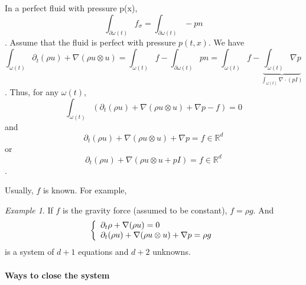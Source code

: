 \documentclass{report}
\newcommand{\R}{\ensuremath{\mathbb{R}}} %
\theoremstyle{plain}
\theoremstyle{definition}
\theoremstyle{remark}
\newtheorem*{ex}{Example}
\begin{document}
In a perfect fluid with pressure p(x),
\begin{equation}
	\int_{\partial\omega(t)}f_\sigma =
	\int_{\partial\omega(t)}-pn
\end{equation}.
Assume that the fluid is perfect with pressure $p(t,x)$.
We have 
$$\int_{\omega(t)}\partial_t(\rho u)+\nabla(\rho u\otimes u)
= \int_{\omega(t)} f - \int_{\partial\omega(t)} p n
= \int_{\omega(t)} f - \underbrace{\int_{\omega(t)} \nabla p
}_{\int_{\omega(t)} \nabla\cdot (p I)}
$$.
Thus, for any $\omega(t)$,
\begin{equation}
	\int_{\omega(t)}\left( 
	\partial_t(\rho u)+\nabla(\rho u\otimes u)
	+  \nabla p - f \right) = 0
\end{equation}
and 
\begin{equation}
	\partial_t(\rho u)+\nabla(\rho u\otimes u)
	+  \nabla p = f \in\R^d
\end{equation}
or
\begin{equation}
	\partial_t(\rho u)+\nabla(\rho u\otimes u + pI)
	= f \in\R^d
\end{equation}.

Usually, $f$ is known. For example,
\begin{ex}
	If $f$ is the gravity force (assumed to be constant),
	$f= \rho g$. And
	\begin{equation}
		\left\lbrace
		\begin{array}[]{l}
			\partial_t \rho +\nabla(\rho u )=0\\
			\partial_t(\rho u ) +\nabla
			(\rho u\otimes u ) +\nabla p
			= \rho g
		\end{array}\right.
	\end{equation}
	is a system of $d+1$ equations and $d+2$ unknowns.
\end{ex}

\paragraph{Ways to close the system}
\end{document}
